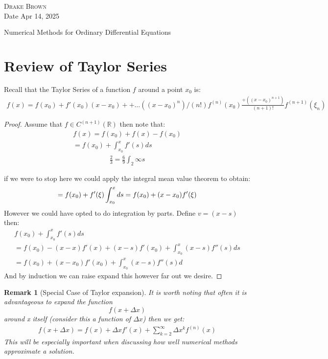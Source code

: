 \documentclass[12pt]{article}
\newcommand{\R}{\mathbb{R}}
\newtheorem*{remark}{Remark}
\begin{document}
\DeclarePairedDelimiter\floor{\lfloor}{\rfloor}
\DeclarePairedDelimiter\ceil{\lceil}{\rceil}


\begin{flushright}
	\textsc{Drake Brown}  \\
	Date Apr 14, 2025
\end{flushright}
\begin{center}
	Numerical Methods for Ordinary Differential Equations
\end{center}

\section{Review of Taylor Series}
Recall that the Taylor Series of a function $f$ around a point $x_0$ is:
\begin{align}
	f(x)=f(x_0)+f'(x_0)(x-x_0)++\dots ((x-x_0)^n)/(n!)f^{(n)}(x_0)\frac{+((x-x_0)^{n+1})}{(n+1)!}f^{(n+1)}(\xi_n)
\end{align}
\begin{proof}
	Assume that $f\in C^{(n+1)}(\R)$ then note that:
	\begin{align}
		f(x)=f(x_0)+f(x)-f(x_0) \\
		=f(x_0)+\int_{x_0}^xf'(s)ds
	\end{align}
	\begin{align}
		\frac{2}{3} = \frac{6}{9}
		\displaystyle\int_{2}^{}
		\infty{s}
	\end{align}

	if we were to stop here we could apply the integral mean value theorem to obtain:
	\begin{equation}
		=f(x_0)+f'(\xi)\int_{x_0}^x ds \\
		=f(x_0)+(x-x_0)f'(\xi)
	\end{equation}
	However we could have opted to do integration by parts. Define $v=(x-s)$ then:
	\begin{align}
		f(x_0)+\int_{x_0}^xf'(s)ds                                           \\
		=f(x_0)-(x-x)f'(x)+(x-s)f'(x_0)+\int_{x_0}^x\left(x-s\right)f''(s)ds \\
		=f(x_0)+(x-x_0)f'(x_0)+\int_{x_0}^x(x-s)f''(s)d
	\end{align}
	And by induction we can raise expand this however far out we desire.
\end{proof}
\begin{remark}[Special Case of Taylor expansion]
	It is worth noting that often it is advantageous to expand the function
	\begin{equation}
		f(x+\Delta x)
	\end{equation}
	around x itself (consider this a function of $\Delta x$) then we get:
	\begin{align}
		f(x+\Delta x)=f(x)+\Delta xf'(x)+\sum_{k=2}^\infty \Delta x^k f^{(n)}(x)
	\end{align}
	This will be especially important when discussing how well numerical methods approximate a solution.
\end{remark}
\end{document}
